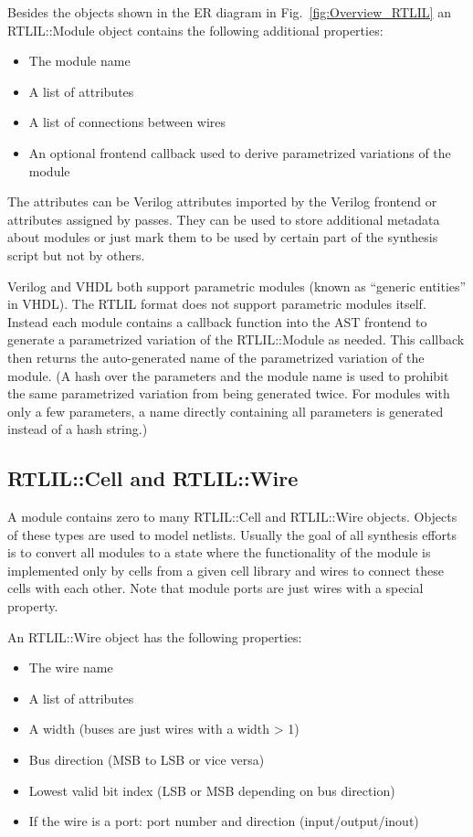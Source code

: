 Besides the objects shown in the ER diagram in Fig.~\ref{fig:Overview_RTLIL} an RTLIL::Module object
contains the following additional properties:

\begin{itemize}
\item The module name
\item A list of attributes
\item A list of connections between wires
\item An optional frontend callback used to derive parametrized variations of the module
\end{itemize}

The attributes can be Verilog attributes imported by the Verilog frontend or attributes assigned
by passes. They can be used to store additional metadata about modules or just mark them to be
used by certain part of the synthesis script but not by others.

Verilog and VHDL both support parametric modules (known as ``generic entities'' in VHDL). The RTLIL
format does not support parametric modules itself. Instead each module contains a callback function
into the AST frontend to generate a parametrized variation of the RTLIL::Module as needed. This
callback then returns the auto-generated name of the parametrized variation of the module. (A hash
over the parameters and the module name is used to prohibit the same parametrized variation from being
generated twice. For modules with only a few parameters, a name directly containing all parameters
is generated instead of a hash string.)

\subsection{RTLIL::Cell and RTLIL::Wire}

A module contains zero to many RTLIL::Cell and RTLIL::Wire objects. Objects of
these types are used to model netlists. Usually the goal of all synthesis efforts is to convert
all modules to a state where the functionality of the module is implemented only by cells
from a given cell library and wires to connect these cells with each other. Note that module
ports are just wires with a special property.

An RTLIL::Wire object has the following properties:

\begin{itemize}
\item The wire name
\item A list of attributes
\item A width (buses are just wires with a width > 1)
\item Bus direction (MSB to LSB or vice versa)
\item Lowest valid bit index (LSB or MSB depending on bus direction)
\item If the wire is a port: port number and direction (input/output/inout)
\end{itemize}

